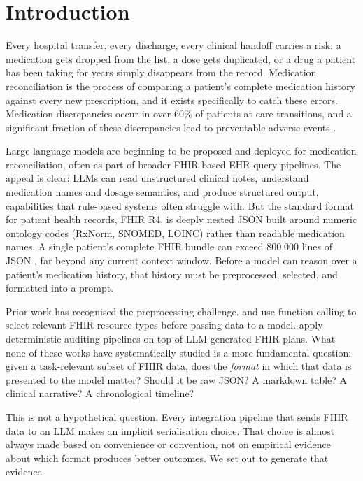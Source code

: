\section{Introduction}
\label{sec:intro}

Every hospital transfer, every discharge, every clinical handoff carries a risk: a
medication gets dropped from the list, a dose gets duplicated, or a drug a patient
has been taking for years simply disappears from the record. Medication reconciliation
is the process of comparing a patient's complete medication history against every new
prescription, and it exists specifically to catch these errors. Medication discrepancies
occur in over 60\% of patients at care transitions, and a significant fraction of these
discrepancies lead to preventable adverse events \citep{asgari2025clinicalsafety}.

Large language models are beginning to be proposed and deployed for medication
reconciliation, often as part of broader FHIR-based EHR query pipelines. The appeal
is clear: LLMs can read unstructured clinical notes, understand medication names and
dosage semantics, and produce structured output, capabilities that rule-based systems
often struggle with. But the standard format for patient health records, FHIR R4,
is deeply nested JSON built around numeric ontology codes (RxNorm, SNOMED, LOINC)
rather than readable medication names. A single patient's complete FHIR bundle can
exceed 800,000 lines of JSON \citep{schmiedmayer2025llmonfhir}, far beyond any current
context window. Before a model can reason over a patient's medication history, that
history must be preprocessed, selected, and formatted into a prompt.

Prior work has recognised the preprocessing challenge. \citet{schmiedmayer2025llmonfhir}
and \citet{schmiedmayer2024llmonfhir} use function-calling to select relevant FHIR
resource types before passing data to a model. \citet{wu2026plannerauditor} apply
deterministic auditing pipelines on top of LLM-generated FHIR plans. What none of
these works have systematically studied is a more fundamental question: given a
task-relevant subset of FHIR data, does the \textit{format} in which that data is
presented to the model matter? Should it be raw JSON? A markdown table? A clinical
narrative? A chronological timeline?

This is not a hypothetical question. Every integration pipeline that sends FHIR data
to an LLM makes an implicit serialisation choice. That choice is almost always made
based on convenience or convention, not on empirical evidence about which format
produces better outcomes. We set out to generate that evidence.

